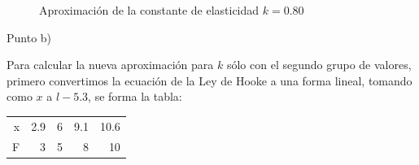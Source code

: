 \documentclass{article}
\begin{document}
\begin{figure}[h]
    \centering
    \caption{Aproximación de la constante de elasticidad \( k = 0.80 \)}
    \label{fig:myplot6}
\end{figure}

\begin{center}
    Punto b) \\
\end{center}

Para calcular la nueva aproximación para \( k \) sólo con el segundo grupo de valores, primero convertimos la ecuación de la Ley de Hooke a una forma lineal, tomando como \( x \) a \( l-5.3 \), se forma la tabla:
\begin{center}
    \begin{tabular}{||r||r|r|r|r||}
    \hline
    x & 2.9 & 6 & 9.1 & 10.6 \\
    F & 3 & 5 & 8 & 10 \\
    \hline
    \end{tabular}
\end{center}
\end{document}
